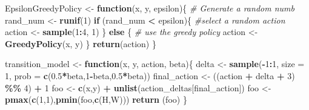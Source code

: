 \documentclass[
]{article}
\newenvironment{Shaded}{\begin{snugshade}}{\end{snugshade}}
\newcommand{\AttributeTok}[1]{\textcolor[rgb]{0.13,0.29,0.53}{#1}}
\newcommand{\CommentTok}[1]{\textcolor[rgb]{0.56,0.35,0.01}{\textit{#1}}}
\newcommand{\ControlFlowTok}[1]{\textcolor[rgb]{0.13,0.29,0.53}{\textbf{#1}}}
\newcommand{\DecValTok}[1]{\textcolor[rgb]{0.00,0.00,0.81}{#1}}
\newcommand{\FloatTok}[1]{\textcolor[rgb]{0.00,0.00,0.81}{#1}}
\newcommand{\FunctionTok}[1]{\textcolor[rgb]{0.13,0.29,0.53}{\textbf{#1}}}
\newcommand{\NormalTok}[1]{#1}
\newcommand{\OtherTok}[1]{\textcolor[rgb]{0.56,0.35,0.01}{#1}}
\newcommand{\SpecialCharTok}[1]{\textcolor[rgb]{0.81,0.36,0.00}{\textbf{#1}}}
\begin{document}
\begin{Shaded}
\begin{Highlighting}[]
\NormalTok{EpsilonGreedyPolicy }\OtherTok{\textless{}{-}} \ControlFlowTok{function}\NormalTok{(x, y, epsilon)\{}
  \CommentTok{\# Generate a random numb}
\NormalTok{  rand\_num }\OtherTok{\textless{}{-}} \FunctionTok{runif}\NormalTok{(}\DecValTok{1}\NormalTok{)}
  \ControlFlowTok{if}\NormalTok{ (rand\_num }\SpecialCharTok{\textless{}}\NormalTok{ epsilon)\{}
   \CommentTok{\#select a random action}
\NormalTok{    action }\OtherTok{\textless{}{-}} \FunctionTok{sample}\NormalTok{(}\DecValTok{1}\SpecialCharTok{:}\DecValTok{4}\NormalTok{, }\DecValTok{1}\NormalTok{)}
\NormalTok{  \} }\ControlFlowTok{else}\NormalTok{ \{}
  \CommentTok{\# use the greedy policy}
\NormalTok{    action }\OtherTok{\textless{}{-}} \FunctionTok{GreedyPolicy}\NormalTok{(x, y)}
\NormalTok{  \}}
  \FunctionTok{return}\NormalTok{(action)}
\NormalTok{\}}

\NormalTok{transition\_model }\OtherTok{\textless{}{-}} \ControlFlowTok{function}\NormalTok{(x, y, action, beta)\{}
\NormalTok{  delta }\OtherTok{\textless{}{-}} \FunctionTok{sample}\NormalTok{(}\SpecialCharTok{{-}}\DecValTok{1}\SpecialCharTok{:}\DecValTok{1}\NormalTok{, }\AttributeTok{size =} \DecValTok{1}\NormalTok{, }\AttributeTok{prob =} \FunctionTok{c}\NormalTok{(}\FloatTok{0.5}\SpecialCharTok{*}\NormalTok{beta,}\DecValTok{1}\SpecialCharTok{{-}}\NormalTok{beta,}\FloatTok{0.5}\SpecialCharTok{*}\NormalTok{beta))}
\NormalTok{  final\_action }\OtherTok{\textless{}{-}}\NormalTok{ ((action }\SpecialCharTok{+}\NormalTok{ delta }\SpecialCharTok{+} \DecValTok{3}\NormalTok{) }\SpecialCharTok{\%\%} \DecValTok{4}\NormalTok{) }\SpecialCharTok{+} \DecValTok{1}
\NormalTok{  foo }\OtherTok{\textless{}{-}} \FunctionTok{c}\NormalTok{(x,y) }\SpecialCharTok{+} \FunctionTok{unlist}\NormalTok{(action\_deltas[final\_action])}
\NormalTok{  foo }\OtherTok{\textless{}{-}} \FunctionTok{pmax}\NormalTok{(}\FunctionTok{c}\NormalTok{(}\DecValTok{1}\NormalTok{,}\DecValTok{1}\NormalTok{),}\FunctionTok{pmin}\NormalTok{(foo,}\FunctionTok{c}\NormalTok{(H,W)))}
  \FunctionTok{return}\NormalTok{ (foo)}
\NormalTok{\}}


\end{Highlighting}
\end{Shaded}
\end{document}
